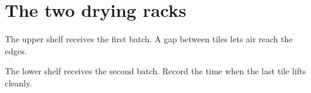 \documentclass[10pt,twocolumn,a4paper]{article}
\begin{document}
\section*{The two drying racks}
The upper shelf receives the first batch. A gap between tiles lets air reach the edges.\par\newpage The lower shelf receives the second batch. Record the time when the last tile lifts cleanly.
\end{document}
